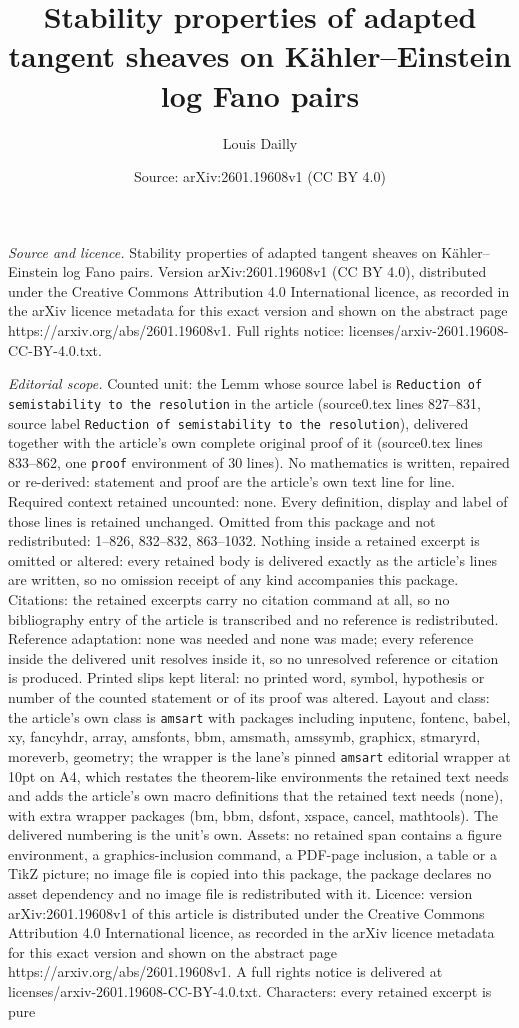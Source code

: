 \documentclass[10pt,a4paper]{amsart}
\title[Stability properties of adapted tangent sheaves on K\"ahler-]{Stability properties of adapted tangent sheaves on K\"ahler--Einstein log Fano pairs}
\author{Louis Dailly}
\date{Source: arXiv:2601.19608v1 (CC BY 4.0)}
\begin{document}
\maketitle

\noindent\emph{Source and licence.} Stability properties of adapted tangent sheaves on K\"ahler--Einstein log Fano pairs. Version arXiv:2601.19608v1 (CC BY 4.0), distributed under the Creative Commons Attribution 4.0 International licence, as recorded in the arXiv licence metadata for this exact version and shown on the abstract page https://arxiv.org/abs/2601.19608v1. Full rights notice: licenses/arxiv-2601.19608-CC-BY-4.0.txt.\par\smallskip

\noindent\textit{Editorial scope.} Counted unit: the Lemm whose source label is \texttt{Reduction of semistability to the resolution} in the article (source0.tex lines 827--831, source label \texttt{Reduction of semistability to the resolution}), delivered together with the article's own complete original proof of it (source0.tex lines 833--862, one \texttt{proof} environment of 30 lines). No mathematics is written, repaired or re-derived: statement and proof are the article's own text line for line. Required context retained uncounted: none. Every definition, display and label of those lines is retained unchanged. Omitted from this package and not redistributed: 1--826, 832--832, 863--1032. Nothing inside a retained excerpt is omitted or altered: every retained body is delivered exactly as the article's lines are written, so no omission receipt of any kind accompanies this package. Citations: the retained excerpts carry no citation command at all, so no bibliography entry of the article is transcribed and no reference is redistributed. Reference adaptation: none was needed and none was made; every reference inside the delivered unit resolves inside it, so no unresolved reference or citation is produced. Printed slips kept literal: no printed word, symbol, hypothesis or number of the counted statement or of its proof was altered. Layout and class: the article's own class is \texttt{amsart} with packages including inputenc, fontenc, babel, xy, fancyhdr, array, amsfonts, bbm, amsmath, amssymb, graphicx, stmaryrd, moreverb, geometry; the wrapper is the lane's pinned \texttt{amsart} editorial wrapper at 10pt on A4, which restates the theorem-like environments the retained text needs and adds the article's own macro definitions that the retained text needs (none), with extra wrapper packages (bm, bbm, dsfont, xspace, cancel, mathtools). The delivered numbering is the unit's own. Assets: no retained span contains a figure environment, a graphics-inclusion command, a PDF-page inclusion, a table or a TikZ picture; no image file is copied into this package, the package declares no asset dependency and no image file is redistributed with it. Licence: version arXiv:2601.19608v1 of this article is distributed under the Creative Commons Attribution 4.0 International licence, as recorded in the arXiv licence metadata for this exact version and shown on the abstract page https://arxiv.org/abs/2601.19608v1. A full rights notice is delivered at licenses/arxiv-2601.19608-CC-BY-4.0.txt. Characters: every retained excerpt is pure 
\end{document}
